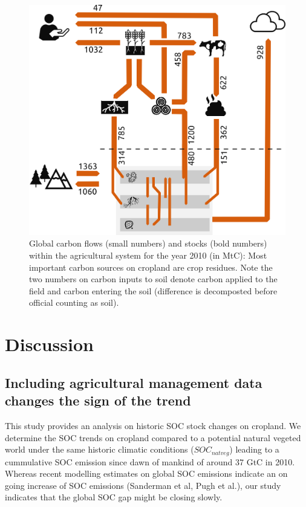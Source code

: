 \documentclass[gc, manuscript]{copernicus}
\begin{document}
\begin{figure}[H]
\includegraphics[width=16cm]{../ResultNotebooks/Output/Images/OuFlowFig} \caption{Global carbon flows (small numbers) and stocks (bold numbers) within the agricultural system for the year 2010 (in MtC): Most important carbon sources on cropland are crop residues. Note the two numbers on carbon inputs to soil denote carbon applied to the field and carbon entering the soil (difference is decomposted before official counting as soil).}\label{fig:FlowFig}
\end{figure}

\newpage

\newpage

\section{Discussion}

\subsection{Including agricultural management data changes the sign of
the trend}

This study provides an analysis on historic SOC stock changes on
cropland. We determine the SOC trends on cropland compared to a
potential natural vegeted world under the same historic climatic
conditions (\(SOC_{natveg}\)) leading to a cummulative SOC emission
since dawn of mankind of around 37 GtC in 2010. Whereas recent modelling
estimates on global SOC emissions indicate an on going increase of SOC
emissions (Sanderman et al, Pugh et al.), our study indicates that the
global SOC gap might be closing slowly.
\end{document}
